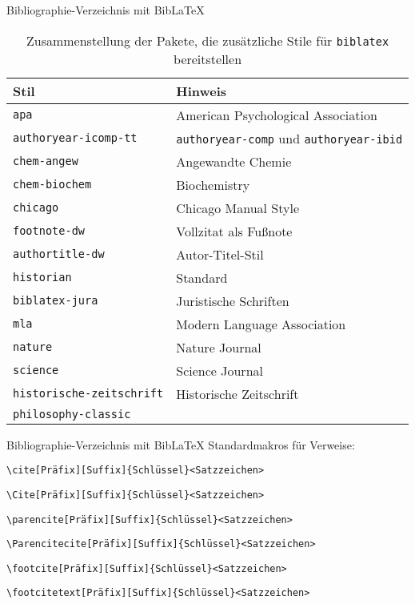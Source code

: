 \begin{frame}[fragile]{Bibliographie-Verzeichnis mit Bib\LaTeX}
\begin{table}
	\caption{Zusammenstellung der Pakete, die zusätzliche Stile für \texttt{biblatex} bereitstellen}
	\begin{tabular}{ll}
		\hline
		Stil & Hinweis \\
		\hline
		\texttt{apa} & American Psychological Association \\
		\texttt{authoryear-icomp-tt} & \texttt{authoryear-comp} und \texttt{authoryear-ibid} \\
		\texttt{chem-angew} & Angewandte Chemie \\
		\texttt{chem-biochem} & Biochemistry \\
		\texttt{chicago} & Chicago Manual Style \\
		\texttt{footnote-dw} & Vollzitat als Fußnote \\
		\texttt{authortitle-dw} & Autor-Titel-Stil \\
		\texttt{historian} & Standard \\
		\texttt{biblatex-jura} & Juristische Schriften \\
		\texttt{mla} & Modern Language Association \\
		\texttt{nature} & Nature Journal \\
		\texttt{science} & Science Journal \\
		\texttt{historische-zeitschrift} & Historische Zeitschrift \\
		\texttt{philosophy-classic} & \\
		\hline
	\end{tabular}
\end{table}

\end{frame}

\begin{frame}[fragile]{Bibliographie-Verzeichnis mit Bib\LaTeX}
Standardmakros für Verweise:
\begin{lstlisting}[sytle=tex, numbers=none]
\cite[Präfix][Suffix]{Schlüssel}<Satzzeichen>
\end{lstlisting}
\begin{lstlisting}[style=tex, numbers=none]
\Cite[Präfix][Suffix]{Schlüssel}<Satzzeichen>
\end{lstlisting}
\begin{lstlisting}[style=tex, numbers=none]
\parencite[Präfix][Suffix]{Schlüssel}<Satzzeichen>
\end{lstlisting}
\begin{lstlisting}[style=tex, numbers=none]
\Parencitecite[Präfix][Suffix]{Schlüssel}<Satzzeichen>
\end{lstlisting}
\begin{lstlisting}[style=tex, numbers=none]
\footcite[Präfix][Suffix]{Schlüssel}<Satzzeichen>
\end{lstlisting}
\begin{lstlisting}[style=tex, numbers=none]
\footcitetext[Präfix][Suffix]{Schlüssel}<Satzzeichen>
\end{lstlisting}
\end{frame}

